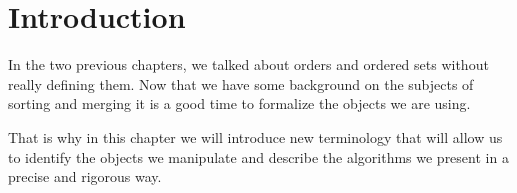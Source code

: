 \section{Introduction}


In the two previous chapters, we talked about orders and ordered sets without
really defining them. Now that we have some background on the subjects of
sorting and merging it is a good time to formalize the objects we are using.

That is why in this chapter we will introduce new terminology that will allow
us to identify the objects we manipulate and describe the algorithms we present
in a precise and rigorous way.

